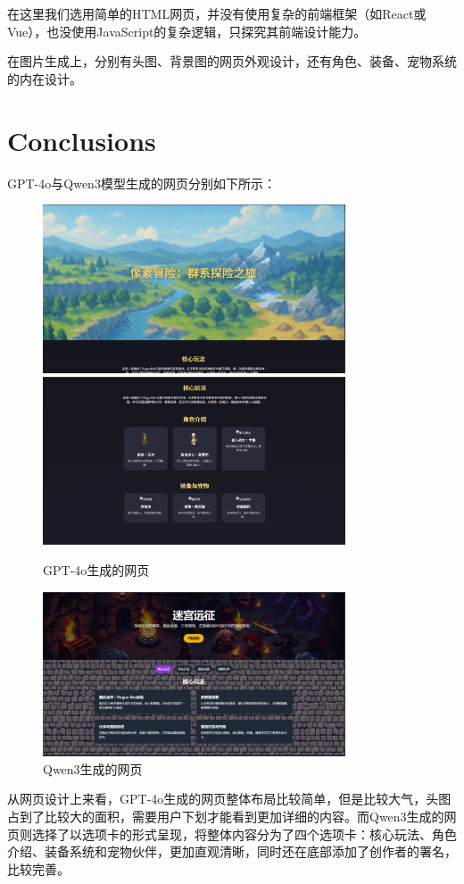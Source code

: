 \documentclass[12pt]{article}
\begin{document}
在这里我们选用简单的HTML网页，并没有使用复杂的前端框架（如React或Vue），也没使用JavaScript的复杂逻辑，只探究其前端设计能力。

在图片生成上，分别有头图、背景图的网页外观设计，还有角色、装备、宠物系统的内在设计。


\section*{\centering Conclusions}
GPT-4o与Qwen3模型生成的网页分别如下所示：
\begin{figure}[H]
    \centering
    \includegraphics[width=0.8\textwidth]{gpt4o.png}
    \includegraphics[width=0.8\textwidth]{gpt4o-2.png}
    \caption{GPT-4o生成的网页}
    \label{fig:gpt4o}
\end{figure}
\begin{figure}[H]
    \centering
    \includegraphics[width=0.8\textwidth]{qwen3.png}
    \caption{Qwen3生成的网页}
    \label{fig:qwen3}
\end{figure}
从网页设计上来看，GPT-4o生成的网页整体布局比较简单，但是比较大气，头图占到了比较大的面积，需要用户下划才能看到更加详细的内容。而Qwen3生成的网页则选择了以选项卡的形式呈现，将整体内容分为了四个选项卡：核心玩法、角色介绍、装备系统和宠物伙伴，更加直观清晰，同时还在底部添加了创作者的署名，比较完善。
\end{document}

